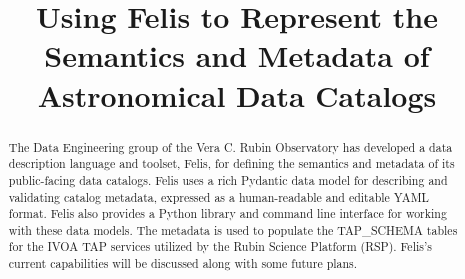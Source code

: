 \documentclass[11pt,twoside]{article}
\begin{document}
\title{Using Felis to Represent the Semantics and Metadata of Astronomical Data Catalogs}




\begin{abstract}
    The Data Engineering group of the Vera C. Rubin Observatory has developed a data description language and toolset, Felis, for defining the semantics and metadata of its public-facing data catalogs. Felis uses a rich Pydantic data model for describing and validating catalog metadata, expressed as a human-readable and editable YAML format. Felis also provides a Python library and command line interface for working with these data models. The metadata is used to populate the TAP\_SCHEMA tables for the IVOA TAP services utilized by the Rubin Science Platform (RSP). Felis's current capabilities will be discussed along with some future plans.
\end{abstract}


\end{document}
